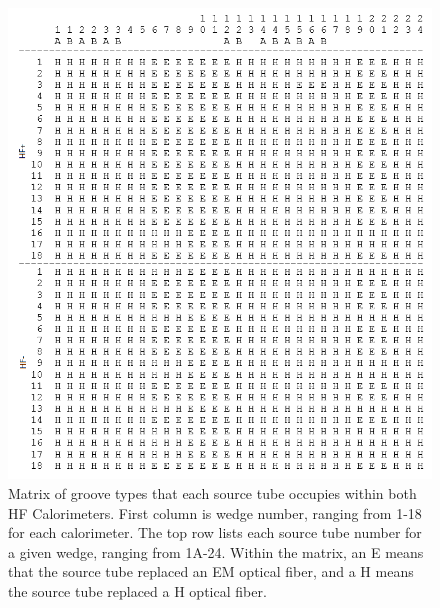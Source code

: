 \begin{figure}[!h]
   \begin{center}
      \includegraphics[width=1.\textwidth]{figures/ch_hfcalibration/Groove_Type.png}
      \caption{Matrix of groove types that each source tube occupies within both HF
      Calorimeters. First column is wedge number, ranging from 1-18 for each calorimeter.
      The top row lists each source tube number for a given wedge, ranging from 1A-24.
      Within the matrix, an E means that the source tube replaced an EM optical fiber, and
      a H means the source tube replaced a H optical fiber.}
      \label{fig:HF_Grooves}
   \end{center}
\end{figure}

